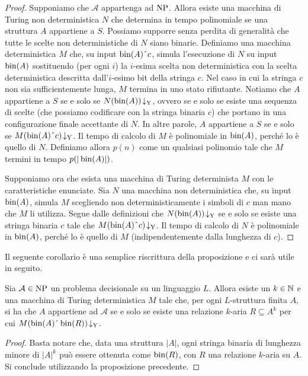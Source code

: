 \begin{proof}
  Supponiamo che $\mathcal{A}$ appartenga ad $\operatorname{NP}$. Allora esiste una macchina di Turing non deterministica $N$ che determina in tempo polinomiale se una struttura $A$ appartiene a $S$.
  Possiamo supporre senza perdita di generalità che tutte le scelte non deterministiche di $N$ siano binarie.
  Definiamo una macchina deterministica $M$ che, su input $\bin(A)\string^ c$, simula l'esecuzione di $N$ su input $\operatorname{bin}(A)$ sostituendo (per ogni $i$) la $i$-esima scelta non deterministica con la scelta deterministica descritta dall'$i$-esimo bit della stringa $c$. Nel caso in cui la stringa $c$ non sia sufficientemente lunga, $M$ termina in uno stato rifiutante.
  Notiamo che $A$ appartiene a $S$ se e solo se $N(\operatorname{bin}(A))\!\downarrow_{\text{Y}}$, ovvero se e solo se esiste una sequenza di scelte (che possiamo codificare con la stringa binaria $c$) che portano in una configurazione finale accettante di $N$. In altre parole, $A$ appartiene a $S$ se e solo se $M(\bin(A)\string^c)\accepts$.
  Il tempo di calcolo di $M$ è polinomiale in $\operatorname{bin}(A)$, perché lo è quello di $N$.
  Definiamo allora $p(n)$ come un qualsiasi polinomio tale che $M$ termini in tempo $p(|\operatorname{bin}(A)|)$.
  
  Supponiamo ora che esista una macchina di Turing determinista $M$ con le caratteristiche enunciate.
  Sia $N$ una macchina non deterministica che, su input $\operatorname{bin}(A)$, simula $M$ scegliendo non deterministicamente i simboli di $c$ man mano che $M$ li utilizza.
  Segue dalle definizioni che $N(\operatorname{bin}(A))\!\downarrow_{\text{Y}}$ se e solo se esiste una stringa binaria $c$ tale che $M(\bin(A)\string^c)\accepts$.
  Il tempo di calcolo di $N$ è polinomiale in $\operatorname{bin}(A)$, perché lo è quello di $M$ (indipendentemente dalla lunghezza di $c$).
\end{proof}


Il seguente corollario è una semplice riscrittura della proposizione e ci sarà
utile in seguito.

\begin{corollario}
\label{cor:caratterizzazione-np}
  Sia $\mathcal{A} \in \operatorname{NP}$ un problema decisionale su un linguaggio $L$. Allora esiste un $k \in \mathbb{N}$ 
  e una macchina di Turing deterministica $M$ tale che, per ogni $L$-struttura finita
  $A$, si ha che $A$ appartiene ad $\mathcal{A}$ se e solo se esiste una relazione $k$-aria $R \subseteq A^k$
  per cui $M(\bin(A)\string^\bin(R))\accepts$.
\end{corollario}
\begin{proof}
 Basta notare che, data una struttura $|A|$, ogni stringa binaria di lunghezza
 minore di $|A|^k$ può
 essere ottenuta come $\operatorname{bin}(R)$, con $R$ una relazione $k$-aria su $A$.
 Si conclude utilizzando la proposizione precedente.
\end{proof}


